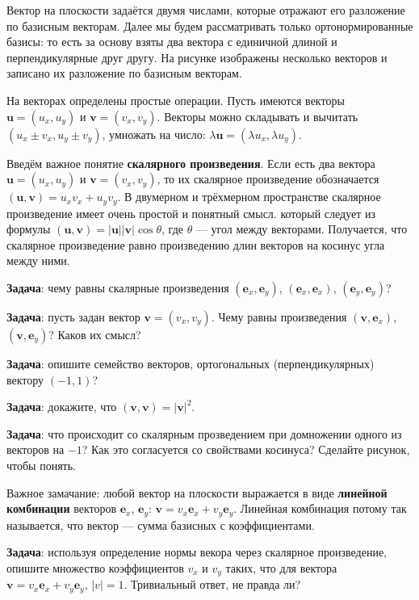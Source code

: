 \documentclass[12pt]{article}
\begin{document}
Вектор на плоскости задаётся двумя числами, которые отражают его разложение по базисным векторам. Далее мы будем рассматривать только ортонормированные базисы: то есть за основу взяты два вектора с единичной длиной и перпендикулярные друг другу. На рисунке изображены несколько векторов и записано их разложение по базисным векторам.

На векторах определены простые операции. Пусть имеются векторы $\mathbf{u} = (u_x, u_y)$ и $\mathbf{v} = (v_x, v_y)$. Векторы можно складывать и вычитать $(u_x \pm v_x, u_y \pm v_y)$, умножать на число: $\lambda \mathbf{u} = (\lambda u_x, \lambda u_y)$.

Введём важное понятие {\bf скалярного произведения}. Если есть два вектора $\mathbf{u} = (u_x, u_y)$ и $\mathbf{v} = (v_x, v_y)$, то их скалярное произведение обозначается $(\mathbf{u}, \mathbf{v}) = u_x v_x + u_y v_y$. В двумерном и трёхмерном пространстве скалярное произведение имеет очень простой и понятный смысл. который следует из формулы $(\mathbf{u}, \mathbf{v}) = |\mathbf{u}| |\mathbf{v}| \cos \theta$, где $\theta$ --- угол между векторами. Получается, что скалярное произведение равно произведению длин векторов на косинус угла между ними.

{\bf Задача}: чему равны скалярные произведения $(\mathbf{e}_x, \mathbf{e}_y)$, $(\mathbf{e}_x, \mathbf{e}_x)$, $(\mathbf{e}_y, \mathbf{e}_y)$?

{\bf Задача}: пусть задан вектор $\mathbf{v} = (v_x, v_y)$. Чему равны произведения $(\mathbf{v}, \mathbf{e}_x)$, $(\mathbf{v}, \mathbf{e}_y)$? Каков их смысл?

{\bf Задача}: опишите семейство векторов, ортогональных (перпендикулярных) вектору $(-1, 1)$? 

{\bf Задача}: докажите, что $(\mathbf{v}, \mathbf{v}) = |\mathbf{v}|^2$.

{\bf Задача}: что происходит со скалярным прозведением при домножении одного из векторов на $-1$? Как это согласуется со свойствами косинуса? Сделайте рисунок, чтобы понять.

Важное замачание: любой вектор на плоскости выражается в виде {\bf линейной комбинации} векторов $\mathbf{e}_x$, $\mathbf{e}_y$: $\mathbf{v} = v_x \mathbf{e}_x + v_y \mathbf{e}_y.$ Линейная комбинация потому так называется, что вектор --- сумма базисных с коэффициентами.

{\bf Задача}: используя определение нормы векора через скалярное произведение, опишите множество коэффициентов $v_x$ и $v_y$ таких, что для вектора $\mathbf{v} = v_x \mathbf{e}_x + v_y \mathbf{e}_y$, $|v| = 1$. Тривиальный ответ, не правда ли?
\end{document}
